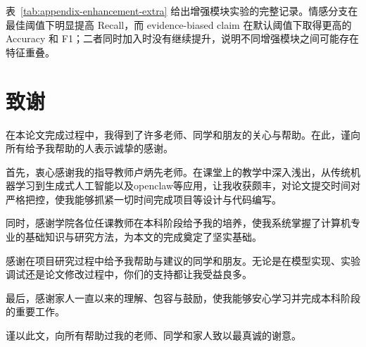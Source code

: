 \documentclass[UTF8,oneside,openright,fontset=none]{ctexbook}
\numberwithin{equation}{chapter}
\begin{document}
表~\ref{tab:appendix-enhancement-extra} 给出增强模块实验的完整记录。情感分支在最佳阈值下明显提高 Recall，而 evidence-biased claim 在默认阈值下取得更高的 Accuracy 和 F1；二者同时加入时没有继续提升，说明不同增强模块之间可能存在特征重叠。

\begin{table}[htbp]
  \centering
  \scriptsize
  \caption{增强模块补充实验结果}
  \label{tab:appendix-enhancement-extra}
\end{table}

\cleardoublepage
\chapter*{致谢}

在本论文完成过程中，我得到了许多老师、同学和朋友的关心与帮助。在此，谨向所有给予我帮助的人表示诚挚的感谢。

首先，衷心感谢我的指导教师卢炳先老师。在课堂上的教学中深入浅出，从传统机器学习到生成式人工智能以及openclaw等应用，让我收获颇丰，对论文提交时间对严格把控，使我能够抓紧一切时间完成项目等设计与代码编写。

同时，感谢学院各位任课教师在本科阶段给予我的培养，使我系统掌握了计算机专业的基础知识与研究方法，为本文的完成奠定了坚实基础。

感谢在项目研究过程中给予我帮助与建议的同学和朋友。无论是在模型实现、实验调试还是论文修改过程中，你们的支持都让我受益良多。

最后，感谢家人一直以来的理解、包容与鼓励，使我能够安心学习并完成本科阶段的重要工作。

谨以此文，向所有帮助过我的老师、同学和家人致以最真诚的谢意。
\end{document}
